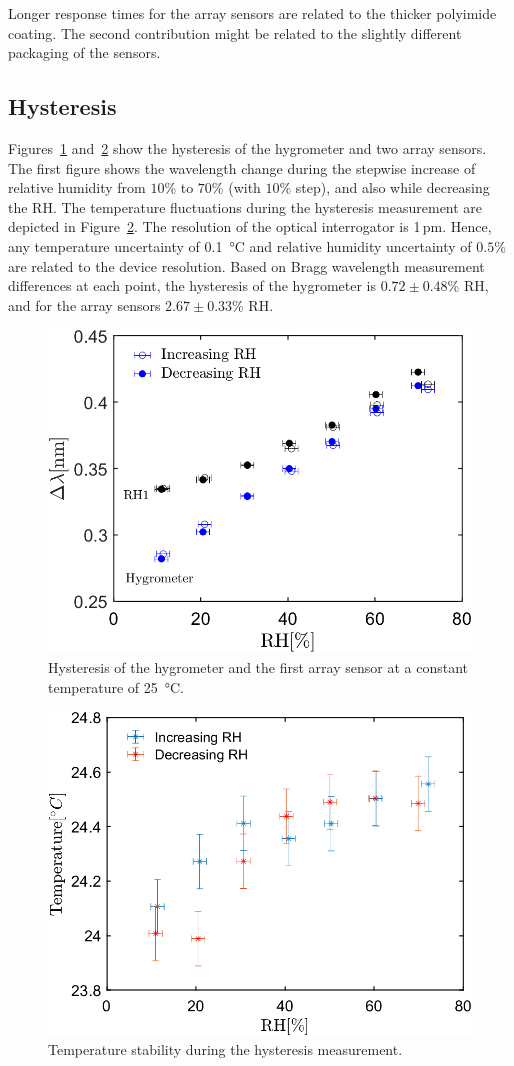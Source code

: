Longer response times for the array sensors are related to the thicker polyimide coating. The second contribution might be related to the slightly different packaging of the sensors. 

\subsection{Hysteresis}
Figures~\ref{fig_hysteresis} and~\ref{fig_hysteresis2} show the hysteresis of the hygrometer and two array sensors. The first figure shows the wavelength change during the stepwise increase of relative humidity from $10$\% to $70$\% (with $10$\% step), and also while decreasing the \gls{RH}. The temperature fluctuations during the hysteresis measurement are depicted in Figure~\ref{fig_hysteresis2}. The resolution of the optical interrogator is 1\,pm. Hence, any temperature uncertainty of \SI{0.1}{\celsius} and relative humidity uncertainty of $0.5$\% are related to the device resolution. Based on Bragg wavelength measurement differences at each point, the hysteresis of the hygrometer is $0.72\pm0.48$\% RH, and for the array sensors $2.67\pm0.33$\% RH. 

\begin{figure}[!h]
\centering
\includegraphics[width=0.57\columnwidth]{Chapter5/images/25_RHS.png}
\caption{Hysteresis of the hygrometer and the first array sensor at a constant temperature of \SI{25}{\celsius}.}
\label{fig_hysteresis}
\end{figure}

\begin{figure}[!h]
\centering
\includegraphics[width=0.57\columnwidth]{Chapter5/images/25_RHST.png}
\caption{Temperature stability during the hysteresis measurement.}
\label{fig_hysteresis2}
\end{figure}
\newpage
